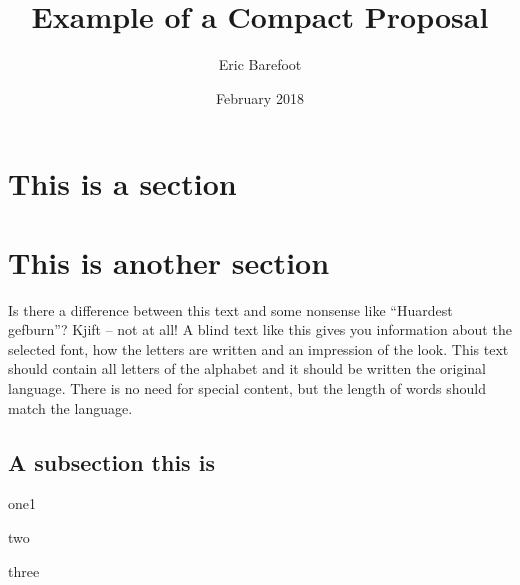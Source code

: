 \documentclass[draft]{compact_proposal}
\title{Example of a Compact Proposal}
\author{Eric Barefoot}
\date{February 2018}
\begin{document}
 
\maketitle


\section{This is a section}
\blindtext[4]


\section{This is another section}
Is there a difference between this text and some nonsense like ``Huardest gefburn''? Kjift – not at all!  
A blind text like this gives you information about the selected font, how the letters are written and  an impression of the look.
This text should contain all letters of the alphabet and it should be written  the original language. 
There is no need for special content, but the length of words should match the language. 

\subsection{A subsection this is}
\blindtext[1]
\begin{tightitemize}
	\item one1
	\item two
	\item three
\end{tightitemize}
\blindtext[4]
\end{document}
